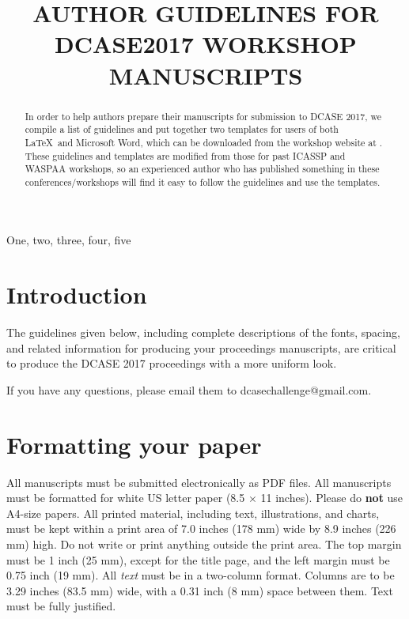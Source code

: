 \documentclass{article}
\title{AUTHOR GUIDELINES FOR DCASE2017 WORKSHOP MANUSCRIPTS}
\begin{document}
\ninept
\maketitle

\begin{sloppy}

\begin{abstract}
In order to help authors prepare their manuscripts for submission to DCASE 2017, we compile a list of guidelines and put together two templates for users of both \LaTeX\ and Microsoft Word, which can be downloaded from the workshop website at \cite{dcase2017web}. These guidelines and templates are modified from those for past ICASSP and WASPAA workshops, so an experienced author who has published something in these conferences/workshops will find it easy to follow the guidelines and use the templates.
\end{abstract}

\begin{keywords}
One, two, three, four, five
\end{keywords}


\section{Introduction}
\label{sec:intro}

The guidelines given below, including complete descriptions of the fonts, spacing, and related information for producing your proceedings manuscripts, are critical to produce the DCASE 2017 proceedings with a more uniform look. 

If you have any questions, please email them to dcasechallenge@gmail.com.


\section{Formatting your paper}
\label{sec:format}

All manuscripts must be submitted electronically as PDF files. All manuscripts must be formatted for white US letter paper (8.5 $\times$ 11 inches). Please do {\bf not} use A4-size papers. All printed material, including text, illustrations, and charts, must be kept within a print area of 7.0 inches (178 mm) wide by 8.9 inches (226 mm) high. Do not write or print anything outside the print area. The top margin must be 1 inch (25 mm), except for the title page, and the left margin must be 0.75 inch (19 mm).  All {\it text} must be in a two-column format. Columns are to be 3.29 inches (83.5 mm) wide, with a 0.31 inch (8 mm) space between them. Text must be fully justified. 


\end{sloppy}
\end{document}
